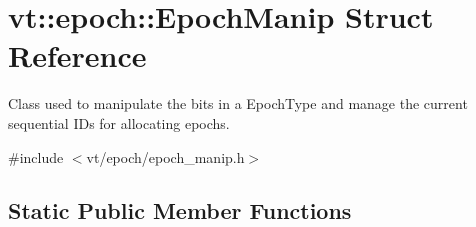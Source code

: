 \hypertarget{structvt_1_1epoch_1_1_epoch_manip}{}\section{vt\+:\+:epoch\+:\+:Epoch\+Manip Struct Reference}
\label{structvt_1_1epoch_1_1_epoch_manip}


Class used to manipulate the bits in a {\ttfamily Epoch\+Type} and manage the current sequential I\+Ds for allocating epochs.  




{\ttfamily \#include $<$vt/epoch/epoch\+\_\+manip.\+h$>$}

\subsection*{Static Public Member Functions}
